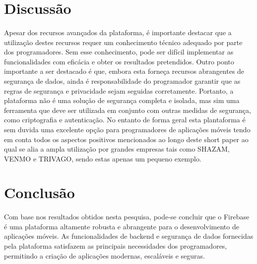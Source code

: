 \documentclass[runningheads]{llncs}
\begin{document}
\section{Discussão}
\paragraph{}
Apesar dos recursos avançados da plataforma, é importante destacar que a utilização destes recursos requer um conhecimento técnico adequado por parte dos programadores. Sem esse conhecimento, pode ser difícil implementar as funcionalidades com eficácia e obter os resultados pretendidos. Outro ponto importante a ser destacado é que, embora esta forneça recursos abrangentes de segurança de dados, ainda é responsabilidade do programador garantir que as regras de segurança e privacidade sejam seguidas corretamente. Portanto, a plataforma não é uma solução de segurança completa e isolada, mas sim uma ferramenta que deve ser utilizada em conjunto com outras medidas de segurança, como criptografia e autenticação. 
No entanto de forma geral esta plantaforma é sem duvida uma excelente opção para programadores de aplicações móveis tendo em conta todos os aspectos positivos mencionados ao longo deste short paper ao qual se alia a ampla utilização por grandes empresas tais como SHAZAM, VENMO e TRIVAGO, sendo estas apenas um pequeno exemplo.

\section{Conclusão}
\paragraph{}
Com base nos resultados obtidos nesta pesquisa, pode-se concluir que o Firebase é uma plataforma altamente robusta e abrangente para o desenvolvimento de aplicações móveis. As funcionalidades de backend e segurança de dados fornecidas pela plataforma satisfazem as principais necessidades dos programadores, permitindo a criação de aplicações modernas, escaláveis e seguras.
\end{document}
